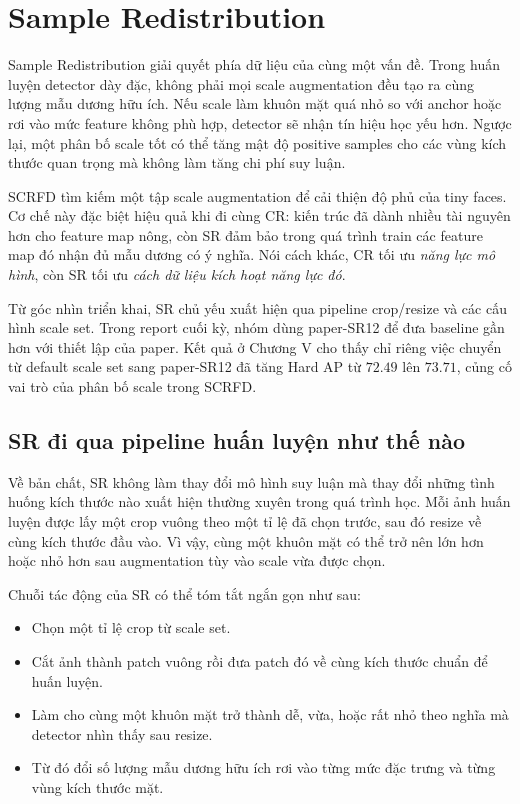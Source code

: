\section{Sample Redistribution}

Sample Redistribution giải quyết phía dữ liệu của cùng một vấn đề. Trong huấn luyện detector dày đặc, không phải mọi scale augmentation đều tạo ra cùng lượng mẫu dương hữu ích. Nếu scale làm khuôn mặt quá nhỏ so với anchor hoặc rơi vào mức feature không phù hợp, detector sẽ nhận tín hiệu học yếu hơn. Ngược lại, một phân bố scale tốt có thể tăng mật độ positive samples cho các vùng kích thước quan trọng mà không làm tăng chi phí suy luận.

SCRFD tìm kiếm một tập scale augmentation để cải thiện độ phủ của tiny faces. Cơ chế này đặc biệt hiệu quả khi đi cùng CR: kiến trúc đã dành nhiều tài nguyên hơn cho feature map nông, còn SR đảm bảo trong quá trình train các feature map đó nhận đủ mẫu dương có ý nghĩa. Nói cách khác, CR tối ưu \textit{năng lực mô hình}, còn SR tối ưu \textit{cách dữ liệu kích hoạt năng lực đó}.

Từ góc nhìn triển khai, SR chủ yếu xuất hiện qua pipeline crop/resize và các cấu hình scale set. Trong report cuối kỳ, nhóm dùng paper-SR12 để đưa baseline gần hơn với thiết lập của paper. Kết quả ở Chương V cho thấy chỉ riêng việc chuyển từ default scale set sang paper-SR12 đã tăng Hard AP từ \(72.49\) lên \(73.71\), củng cố vai trò của phân bố scale trong SCRFD.

\subsection{SR đi qua pipeline huấn luyện như thế nào}

Về bản chất, SR không làm thay đổi mô hình suy luận mà thay đổi những tình huống kích thước nào xuất hiện thường xuyên trong quá trình học. Mỗi ảnh huấn luyện được lấy một crop vuông theo một tỉ lệ đã chọn trước, sau đó resize về cùng kích thước đầu vào. Vì vậy, cùng một khuôn mặt có thể trở nên lớn hơn hoặc nhỏ hơn sau augmentation tùy vào scale vừa được chọn.

Chuỗi tác động của SR có thể tóm tắt ngắn gọn như sau:
\begin{itemize}
  \item Chọn một tỉ lệ crop từ scale set.
  \item Cắt ảnh thành patch vuông rồi đưa patch đó về cùng kích thước chuẩn để huấn luyện.
  \item Làm cho cùng một khuôn mặt trở thành dễ, vừa, hoặc rất nhỏ theo nghĩa mà detector nhìn thấy sau resize.
  \item Từ đó đổi số lượng mẫu dương hữu ích rơi vào từng mức đặc trưng và từng vùng kích thước mặt.
\end{itemize}

